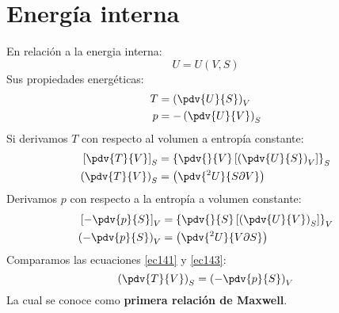\documentclass[../main]{subfiles}
\begin{document}
\section{Energía interna}
En relación a la energia interna:
\begin{equation}
    U=U(V,S)
\end{equation}
Sus propiedades energéticas:
\begin{align}
    T & =\left( \pdv{U}{S} \right)_V \\
    p & =-\left( \pdv{U}{V}\right)_S
\end{align}
Si derivamos $T$ con respecto al volumen a entropía constante:
\begin{align}
    \left[ \pdv{T}{V} \right]_S & =\left\{ \pdv{}{V}\left[\left( \pdv{U}{S}\right)_V \right] \right\}_S \\
    \left(\pdv{T}{V}\right)_S   & =\left(\pdv{^2 U}{S \partial V}\right)
    \label{ec141}
\end{align}
Derivamos $p$ con respecto a la entropía a volumen constante:
\begin{align}
    \left[ - \pdv{p}{S}\right]_V & =\left\{ \pdv{}{S}\left[\left( \pdv{U}{V}\right)_S \right] \right\}_V \\
    \left( - \pdv{p}{S}\right)_V & =\left( \pdv{^2 U}{V \partial S}\right)
    \label{ec143}
\end{align}
Comparamos las ecuaciones \eqref{ec141} y \eqref{ec143}:
\begin{equation}
    \left(\pdv{T}{V}\right)_S=\left( - \pdv{p}{S}\right)_V
\end{equation}
La cual se conoce como \textbf{primera relación de Maxwell}.
\end{document}
